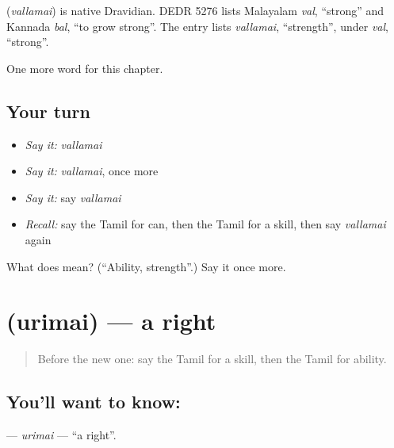 \begin{cousinweb}
\textbf{} (\emph{vallamai}) is native Dravidian. DEDR 5276 lists Malayalam \emph{val}, \textquotedblleft{}strong\textquotedblright{} and Kannada \emph{bal}, \textquotedblleft{}to grow strong\textquotedblright{}. The entry lists \emph{vallamai}, \textquotedblleft{}strength\textquotedblright{}, under \emph{val}, \textquotedblleft{}strong\textquotedblright{}.
\end{cousinweb}

\begin{grammarlens}[title={What you've built}]
One more word for this chapter.
\end{grammarlens}

\subsection*{Your turn}
\begin{itemize}
\raggedright
  \item \emph{Say it:} \emph{vallamai}
  \item \emph{Say it:} \emph{vallamai}, once more
  \item \emph{Say it:} say \emph{vallamai}
  \item \emph{Recall:} say the Tamil for can, then the Tamil for a skill, then say \emph{vallamai} again
\end{itemize}

\begin{tcolorbox}[breakable,colback=teal!4,colframe=teal!35!black,title={Before you move on}]
What does  mean? (\textquotedblleft{}Ability, strength\textquotedblright{}.) Say it once more.
\end{tcolorbox}
\section[\texorpdfstring{\ta{உரிமை} (urimai)}{உரிமை (urimai)}]{ (urimai) — a right}

\label{lesson:TA-C117-urimai}



\begin{quote}
Before the new one: say the Tamil for a skill, then the Tamil for ability.
\end{quote}

\subsection*{You'll want to know: }
\textbf{} — \emph{urimai} — \textquotedblleft{}a right\textquotedblright{}.

